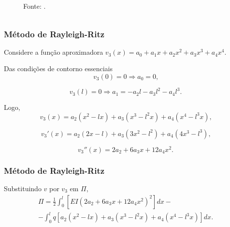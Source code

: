 \documentclass{beamer}
\newcommand{\fonte}[1]{
	\begin{center}
		\footnotesize Fonte: #1
	\end{center}
}
\newif\ifcompilepause
\newcommand{\cpause}{
	\ifcompilepause
	\pause
	\fi
}
\begin{document}
{\begin{frame}
\begin{itemize}
\begin{columns}
\begin{column}{0.5\textwidth}
\begin{figure}[h]
{
						}
						\\
						\fonte{.}
					\end{figure}
				\end{column}
			\end{columns}
		\end{itemize}
	\end{frame}
	}
	
	\begin{frame}
		\frametitle{Método de Rayleigh-Ritz}
		\justify
		
		Considere a função aproximadora $v_3(x)=a_0 + a_1 x + a_2 x^2 + a_3 x^3 + a_4 x^4$. \cpause Das condições de contorno essenciais
		$$
			v_3(0)=0\Longrightarrow a_0 = 0\text{,}
		$$
		\cpause
		$$
			v_3(l)=0\Longrightarrow a_1 = -a_2l - a_3l^2 - a_4l^3\text{.}
		$$
		\cpause
		Logo, 
		$$v_3(x)=a_2(x^2-lx)+a_3(x^3-l^2x) + a_4(x^4-l^3x)\text{,}$$
		\cpause 
		\vspace{-5pt}
		$$v_3'(x)=a_2(2x-l)+a_3(3x^2-l^2)+a_4(4x^3-l^3)\text{,}$$
		\cpause
		\vspace{-5pt}
		$$v_3''(x)=2a_2 + 6a_3x + 12a_4x^2\text{.}$$
	\end{frame}
	
	\begin{frame}
		\frametitle{Método de Rayleigh-Ritz}
		\justify
		
		Substituindo $v$ por $v_3$ em $\Pi$,
		\begin{multline*}
			\Pi = \frac{1}{2} \int_0^l \left [
				EI(2a_2+6a_3x+12a_4x^2)^2
			\right ] dx
			-
			\\
			-
			\int_0^l q \left [
				a_2(x^2 - lx)
				+
				a_3(x^3 - l^2x)
				+
				a_4(x^4 - l^3x)
			\right ] dx
			\text{.}
		\end{multline*}
	\end{frame}
	
\end{document}

